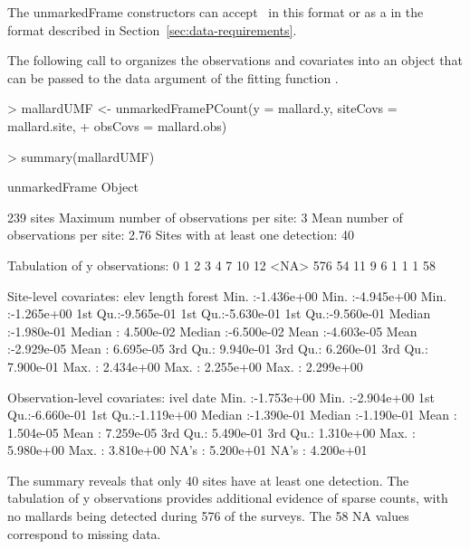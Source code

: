 \documentclass[article,shortnames]{jss}
\newcommand{\ocovs}{\code{obsCovs}}
\begin{document}
{The unmarkedFrame constructors can accept \ocovs\ in this  format or 
as a  in the format described in 
Section~\ref{sec:data-requirements}.

The following call to  organizes the observations 
and covariates into an object that can be passed to the data argument of
the fitting function .

\begin{Schunk}
\begin{Sinput}
> mallardUMF <- unmarkedFramePCount(y = mallard.y, siteCovs = mallard.site, 
+     obsCovs = mallard.obs)
\end{Sinput}
\end{Schunk}

\begin{Schunk}
\begin{Sinput}
> summary(mallardUMF)
\end{Sinput}
\begin{Soutput}
unmarkedFrame Object

239 sites
Maximum number of observations per site: 3 
Mean number of observations per site: 2.76 
Sites with at least one detection: 40 

Tabulation of y observations:
   0    1    2    3    4    7   10   12 <NA> 
 576   54   11    9    6    1    1    1   58 

Site-level covariates:
      elev                length               forest          
 Min.   :-1.436e+00   Min.   :-4.945e+00   Min.   :-1.265e+00  
 1st Qu.:-9.565e-01   1st Qu.:-5.630e-01   1st Qu.:-9.560e-01  
 Median :-1.980e-01   Median : 4.500e-02   Median :-6.500e-02  
 Mean   :-4.603e-05   Mean   :-2.929e-05   Mean   : 6.695e-05  
 3rd Qu.: 9.940e-01   3rd Qu.: 6.260e-01   3rd Qu.: 7.900e-01  
 Max.   : 2.434e+00   Max.   : 2.255e+00   Max.   : 2.299e+00  

Observation-level covariates:
      ivel                 date           
 Min.   :-1.753e+00   Min.   :-2.904e+00  
 1st Qu.:-6.660e-01   1st Qu.:-1.119e+00  
 Median :-1.390e-01   Median :-1.190e-01  
 Mean   : 1.504e-05   Mean   : 7.259e-05  
 3rd Qu.: 5.490e-01   3rd Qu.: 1.310e+00  
 Max.   : 5.980e+00   Max.   : 3.810e+00  
 NA's   : 5.200e+01   NA's   : 4.200e+01  
\end{Soutput}
\end{Schunk}

The summary reveals that only 40 sites have at least one detection. The 
tabulation of y observations provides additional evidence of sparse counts, 
with no mallards being detected during 576 of the surveys. The 58 NA values 
correspond to missing data. 


}
\end{document}
